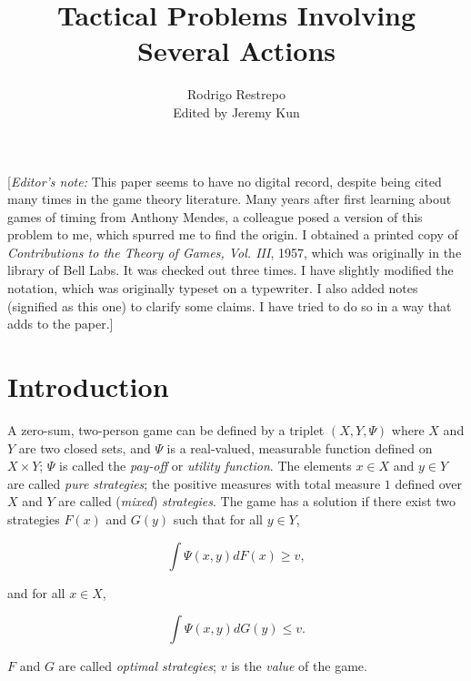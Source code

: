 \documentclass{article}
\title{Tactical Problems Involving Several Actions}
\author{Rodrigo Restrepo \\ Edited by Jeremy Kun}
\theoremstyle{remark}
\begin{document}
\maketitle

[\emph{Editor's note:} This paper seems to have no digital record, despite
being cited many times in the game theory literature. Many years after first
learning about games of timing from Anthony Mendes, a colleague posed a version
of this problem to me, which spurred me to find the origin. I obtained a
printed copy of \emph{Contributions to the Theory of Games, Vol.  III}, 1957,
which was originally in the library of Bell Labs. It was checked out three
times. I have slightly modified the notation, which was originally typeset on a
typewriter. I also added notes (signified as this one) to clarify some claims.
I have tried to do so in a way that adds to the paper.]

\section{Introduction}

A zero-sum, two-person game can be defined by a triplet $(X, Y, \Psi)$ where
$X$ and $Y$ are two closed sets, and $\Psi$ is a real-valued, measurable
function defined on $X \times Y$; $\Psi$ is called the \emph{pay-off} or
\emph{utility function}. The elements $x \in X$ and $y \in Y$ are called
\emph{pure strategies}; the positive measures with total measure $1$ defined
over $X$ and $Y$ are called (\emph{mixed}) \emph{strategies}. The game has a
solution if there exist two strategies $F(x)$ and $G(y)$ such that for all $y
\in Y$,

\[
    \int \Psi(x, y) dF(x) \geq v,
\]

and for all $x \in X$,

\[
    \int \Psi(x, y) dG(y) \leq v.
\]

$F$ and $G$ are called \emph{optimal strategies}; $v$ is the \emph{value} of
the game.
\end{document}
